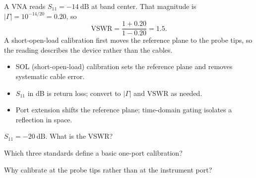 \begin{workedexample}
A VNA reads $S_{11} = -14\ \text{dB}$ at band center. That magnitude is
$|\Gamma| = 10^{-14/20} = 0.20$, so
\[ \text{VSWR} = \frac{1 + 0.20}{1 - 0.20} = 1.5. \]
A short-open-load calibration first moves the reference plane to the probe tips,
so the reading describes the device rather than the cables.
\end{workedexample}

\begin{keytakeaways}
\begin{itemize}[leftmargin=1.4em,itemsep=2pt]
\item SOL (short-open-load) calibration sets the reference plane and removes systematic cable error.
\item $S_{11}$ in dB is return loss; convert to $|\Gamma|$ and VSWR as needed.
\item Port extension shifts the reference plane; time-domain gating isolates a reflection in space.
\end{itemize}
\end{keytakeaways}

\begin{exercises}
\item $S_{11} = -20\ \text{dB}$. What is the VSWR?
\item Which three standards define a basic one-port calibration?
\item Why calibrate at the probe tips rather than at the instrument port?
\end{exercises}

